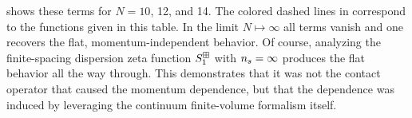  shows these terms for $N=10$, 12, and 14.
The colored dashed lines in  correspond to the functions given in this table.  In the limit $N\mapsto\infty$ all terms vanish and one recovers the flat, momentum-independent behavior.
Of course, analyzing the finite-spacing dispersion zeta function $S^{\boxplus}_1$ with ${n_s}=\infty$ produces the flat behavior all the way through.
This demonstrates that it was not the contact operator that caused the momentum dependence, but that the dependence was induced by leveraging the continuum finite-volume formalism itself.

